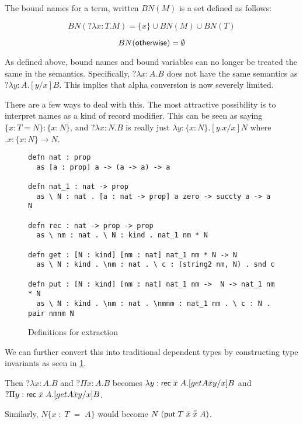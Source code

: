 \begin{definition}
The bound names for a term, written $BN(M)$ is a set defined as follows:

\[ 
BN(?\lambda x : T . M) = \{ x \} \cup BN(M) \cup BN(T)
\]

\[ 
BN(\mathsf{otherwise}) = \emptyset
\]

\end{definition}

As defined above, bound names and bound variables can no longer be treated the same in the semantics.  
Specifically, $?\lambda x : A . B$ does not have the same semantics as $?\lambda y : A . [y / x] B$.  
This implies that alpha conversion is now severely limited.  

There are a few ways to deal with this.  
The most attractive possibility is to interpret names as a kind of record modifier.
This can be seen as saying $\{ x : T = N \} : \{ x : N \}$, 
and $?\lambda x : N . B$ is really just $\lambda y : \{ x : N \} . [ y.x / x ] N$ where $ .x : \{ x : N \} \rightarrow N$.

\begin{figure}[H]
\begin{lstlisting}
defn nat : prop 
  as [a : prop] a -> (a -> a) -> a

defn nat_1 : nat -> prop
  as \ N : nat . [a : nat -> prop] a zero -> succty a -> a N

defn rec : nat -> prop -> prop
  as \ nm : nat . \ N : kind . nat_1 nm * N

defn get : [N : kind] [nm : nat] nat_1 nm * N -> N
  as \ N : kind . \nm : nat . \ c : (string2 nm, N) . snd c

defn put : [N : kind] [nm : nat] nat_1 nm ->  N -> nat_1 nm * N
  as \ N : kind . \nm : nat . \nmnm : nat_1 nm . \ c : N . pair nmnm N
\end{lstlisting}
\caption{Definitions for extraction}
\label{code:ideal}
\end{figure}

We can further convert this into traditional dependent types by constructing
 type invariants as seen in \ref{code:ideal}.

Then $?\lambda x : A . B$ and $?\Pi x : A . B$ 
becomes $\lambda y : \mathsf{rec}\;\bar{x}\;A . [get A \bar{x} y / x ] B$
and $?\Pi y : \mathsf{rec}\;\bar{x}\;A . [get A \bar{x} y / x ] B$.

Similarly, $N \{ x\; : \; T \; = \;A \} $
would become $N\;( \mathsf{put} \; T \; \bar{x} \; \bar{\bar{x}} \; A)$.

